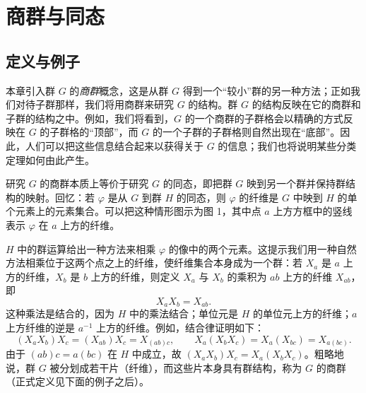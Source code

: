 \chapter{商群与同态}

\section{定义与例子}

本章引入群 $G$ 的\emph{商群}概念，这是从群 $G$ 得到一个“较小”群的另一种方法；正如我们对待子群那样，我们将用商群来研究 $G$ 的结构。群 $G$ 的结构反映在它的商群和子群的结构之中。例如，我们将看到，$G$ 的一个商群的子群格会以精确的方式反映在 $G$ 的子群格的“顶部”，而 $G$ 的一个子群的子群格则自然出现在“底部”。因此，人们可以把这些信息结合起来以获得关于 $G$ 的信息；我们也将说明某些分类定理如何由此产生。

研究 $G$ 的商群本质上等价于研究 $G$ 的同态，即把群 $G$ 映到另一个群并保持群结构的映射。回忆：若 $\varphi$ 是从 $G$ 到群 $H$ 的同态，则 $\varphi$ 的纤维是 $G$ 中映到 $H$ 的单个元素上的元素集合。可以把这种情形图示为图 1，其中点 $a$ 上方方框中的竖线表示 $\varphi$ 在 $a$ 上方的纤维。

\begin{center}
\end{center}

$H$ 中的群运算给出一种方法来相乘 $\varphi$ 的像中的两个元素。这提示我们用一种自然方法相乘位于这两个点之上的纤维，使纤维集合本身成为一个群：若 $X_a$ 是 $a$ 上方的纤维，$X_b$ 是 $b$ 上方的纤维，则定义 $X_a$ 与 $X_b$ 的乘积为 $ab$ 上方的纤维 $X_{ab}$，即
\[
  X_aX_b=X_{ab}.
\]
这种乘法是结合的，因为 $H$ 中的乘法结合；单位元是 $H$ 的单位元上方的纤维；$a$ 上方纤维的逆是 $a^{-1}$ 上方的纤维。例如，结合律证明如下：
\[
  (X_aX_b)X_c=(X_{ab})X_c=X_{(ab)c},\qquad
  X_a(X_bX_c)=X_a(X_{bc})=X_{a(bc)}.
\]
由于 $(ab)c=a(bc)$ 在 $H$ 中成立，故 $(X_aX_b)X_c=X_a(X_bX_c)$。粗略地说，群 $G$ 被分划成若干片（纤维），而这些片本身具有群结构，称为 $G$ 的商群（正式定义见下面的例子之后）。

